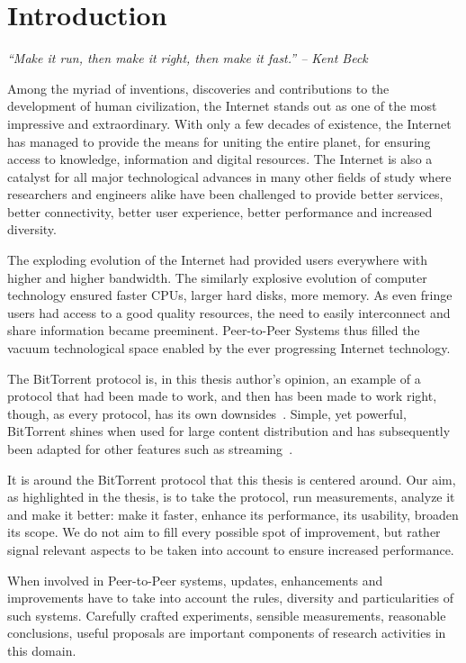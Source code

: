 
\chapter{Introduction}
\label{chapter:intro}

\textit{``Make it run, then make it right, then make it fast.'' -- Kent Beck}

Among the myriad of inventions, discoveries and contributions to the
development of human civilization, the Internet stands out as one of the
most impressive and extraordinary. With only a few decades of existence, the
Internet has managed to provide the means for uniting the entire planet, for
ensuring access to knowledge, information and digital resources. The Internet
is also a catalyst for all major technological advances in many other fields
of study where researchers and engineers alike have been challenged to provide
better services, better connectivity, better user experience, better
performance and increased diversity.

The exploding evolution of the Internet had provided users everywhere with
higher and higher bandwidth. The similarly explosive evolution of computer
technology ensured faster CPUs, larger hard disks, more memory. As even fringe
users had access to a good quality resources, the need to easily interconnect
and share information became preeminent. Peer-to-Peer Systems thus filled the
vacuum technological space enabled by the ever progressing Internet
technology.

The BitTorrent protocol is, in this thesis author's opinion, an example of a
protocol that had been made to work, and then has been made to work right,
though, as every protocol, has its own downsides~\cite{bittorrent-trade-offs}.
Simple, yet powerful, BitTorrent shines when used for large content
distribution and has subsequently been adapted for other features such as
streaming~\cite{bittorrent-streaming}.

It is around the BitTorrent protocol that this thesis is centered around. Our
aim, as highlighted in the thesis, is to take the protocol, run measurements,
analyze it and make it better: make it faster, enhance its performance, its
usability, broaden its scope. We do not aim to fill every possible spot of
improvement, but rather signal relevant aspects to be taken into account to
ensure increased performance.

When involved in Peer-to-Peer systems, updates, enhancements and improvements
have to take into account the rules, diversity and particularities of such
systems. Carefully crafted experiments, sensible measurements, reasonable
conclusions, useful proposals are important components of research activities
in this domain.

